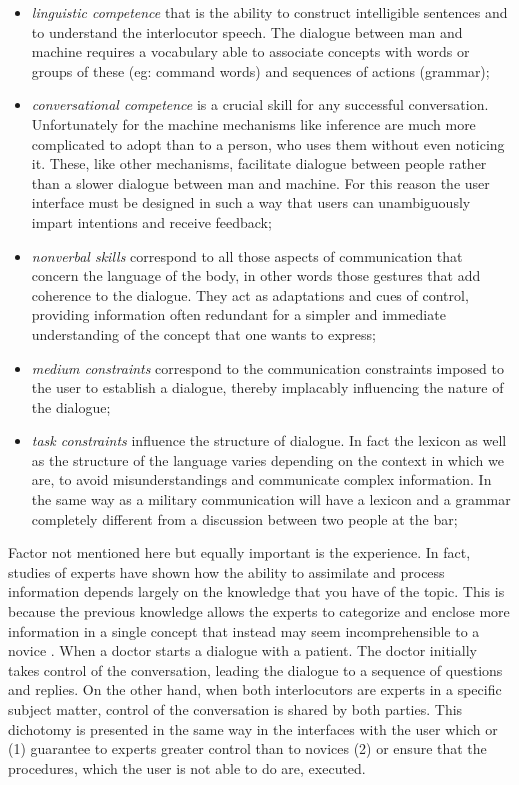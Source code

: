 \documentclass{thesisreport}
\begin{document}
 \begin{itemize}
     \item \textit{linguistic competence} that is the ability to construct intelligible sentences and to understand the interlocutor speech. The dialogue between man and machine requires a vocabulary able to associate concepts with words or groups of these (eg: command words) and sequences of actions (grammar);
     \item \textit{conversational competence} is a crucial skill for any successful conversation. Unfortunately for the machine mechanisms like inference are much more complicated to adopt than to a person, who uses them without even noticing it. These, like other mechanisms, facilitate dialogue between people rather than a slower dialogue between man and machine. For this reason the user interface must be designed in such a way that users can unambiguously impart intentions and receive feedback;
     \item \textit{nonverbal skills} correspond to all those aspects of communication that concern the language of the body, in other words those gestures that add coherence to the dialogue. They act as adaptations and cues of control, providing information often redundant for a simpler and immediate understanding of the concept that one wants to express;
     \item \textit{medium constraints} correspond to the communication constraints imposed to the user to establish a dialogue, thereby implacably influencing the nature of the dialogue;
     \item \textit{task constraints} influence the structure of dialogue. In fact the lexicon as well as the structure of the language  varies depending on the context in which we are, to avoid misunderstandings and communicate complex information. In the same way as a military communication  will have a lexicon and a grammar completely different from a discussion between two people at the bar;
     
 \end{itemize}
 Factor not mentioned here but equally important is the experience. In fact, studies of experts have shown how the ability to assimilate and process information depends largely on the knowledge that you have of the topic. This is because the previous knowledge allows the experts to categorize and enclose more information in a single concept that instead may seem incomprehensible to a novice \cite{fong2001collaboration}.
 When a doctor starts a dialogue with a patient. The doctor initially takes control of the conversation, leading the dialogue to a sequence of questions and replies. On the other hand, when both interlocutors are experts in a specific subject matter, control of the conversation is shared by both parties.
 This dichotomy is presented in the same way in the interfaces with the user which or (1) guarantee to experts greater control than to novices (2) or ensure that the procedures, which the user is not able to do are, executed.
\end{document}
